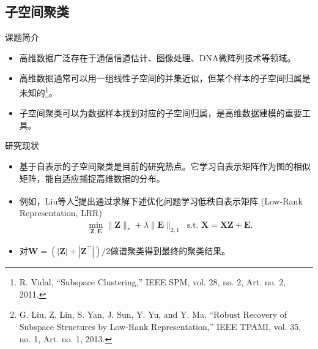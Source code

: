 \documentclass{beamer}
\begin{document}
\subsection{子空间聚类}

\begin{frame}{课题简介}

    \begin{itemize}
        \item 高维数据广泛存在于通信信道估计、图像处理、DNA微阵列技术等领域。
        
        \vspace{0.4cm}
        \item 高维数据通常可以用一组线性子空间的并集近似，但某个样本的子空间归属是未知的\footnote{\scriptsize\cite{5714408} R. Vidal, “Subspace Clustering,” IEEE SPM, vol. 28, no. 2, Art. no. 2, 2011.}。
        \vspace{0.4cm}
        \item 子空间聚类可以为数据样本找到对应的子空间归属，是高维数据建模的重要工具。
        
    \end{itemize}
\end{frame}

\begin{frame}{研究现状}
\begin{itemize}
    \item 基于自表示的子空间聚类是目前的研究热点。它学习自表示矩阵作为图的相似矩阵，能自适应捕捉高维数据的分布。
    \vspace{0.2cm}
    
    \item 例如，Liu等人\footnote{\cite{6180173} G. Liu, Z. Lin, S. Yan, J. Sun, Y. Yu, and Y. Ma, “Robust Recovery of Subspace Structures by Low-Rank Representation,” IEEE TPAMI, vol. 35, no. 1, Art. no. 1, 2013.}提出通过求解下述优化问题学习低秩自表示矩阵 (Low-Rank Representation, LRR)
	\begin{equation}
		\begin{aligned}
			&\min _{\mathbf{Z}, \mathbf{E} }\|\mathbf{Z}\|_{*}+\lambda\|\mathbf{E}\|_{2,1} ~\text { s.t. } \mathbf{X}=\mathbf{X Z}+\mathbf{E}.
		\end{aligned}
		\label{eq_LRR}
	\end{equation}
	
	\item 对$\mathbf{W}\!=\!(|\mathbf{Z}|\!+\!|\mathbf{Z}^{\!\top}|)\!/2$做谱聚类得到最终的聚类结果。
\end{itemize}
\end{frame}
\end{document}
